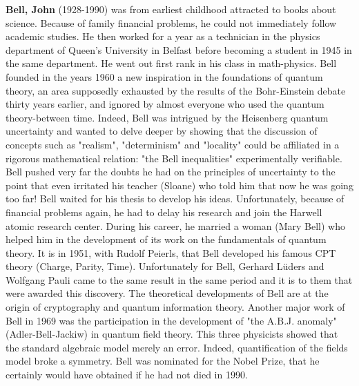 \textbf{Bell, John} (1928-1990) was from earliest childhood attracted to books about science. Because of family financial problems, he could not immediately follow academic studies. He then worked for a year as a technician in the physics department of Queen's University in Belfast before becoming a student in 1945 in the same department. He went out first rank in his class in math-physics. Bell founded in the years 1960 a new inspiration in the foundations of quantum theory, an area supposedly exhausted by the results of the Bohr-Einstein debate thirty years earlier, and ignored by almost everyone who used the quantum theory-between time. Indeed, Bell was intrigued by the Heisenberg quantum uncertainty and wanted to delve deeper by showing that the discussion of concepts such as "realism", "determinism" and "locality" could be affiliated in a rigorous mathematical relation: "the Bell inequalities" experimentally verifiable. Bell pushed very far the doubts he had on the principles of uncertainty to the point that even irritated his teacher (Sloane) who told him that now he was going too far! Bell waited for his thesis to develop his ideas. Unfortunately, because of financial problems again, he had to delay his research and join the Harwell atomic research center. During his career, he married a woman (Mary Bell) who helped him in the development of its work on the fundamentals of quantum theory. It is in 1951, with Rudolf Peierls, that Bell developed his famous CPT theory (Charge, Parity, Time). Unfortunately for Bell, Gerhard Lüders and Wolfgang Pauli came to the same result in the same period and it is to them that were awarded this discovery. The theoretical developments of Bell are at the origin of cryptography and quantum information theory. Another major work of Bell in 1969 was the participation in the development of "the A.B.J. anomaly" (Adler-Bell-Jackiw) in quantum field theory. This three physicists showed that the standard algebraic model merely an error. Indeed, quantification of the fields model broke a symmetry. Bell was nominated for the Nobel Prize, that he certainly would have obtained if he had not died in 1990.

